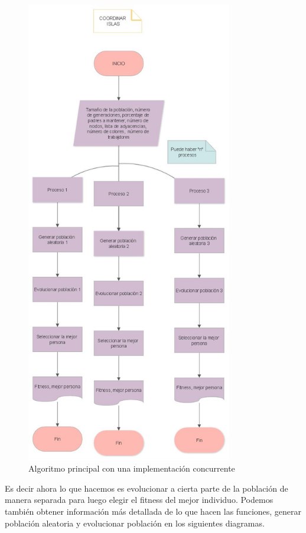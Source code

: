 \documentclass{article}
\begin{document}
\begin{figure}[H]
    \centering
    \includegraphics[width=9cm]{islas.jpg}
    \caption{Algoritmo principal con una implementación concurrente}
    \label{fig:my_label}
\end{figure}
Es decir ahora lo que hacemos es evolucionar a cierta parte de la población de manera separada para luego elegir el fitness del mejor individuo.
Podemos también obtener información más detallada de lo que hacen las funciones, generar población aleatoria y evolucionar población en los siguientes diagramas.
\end{document}
